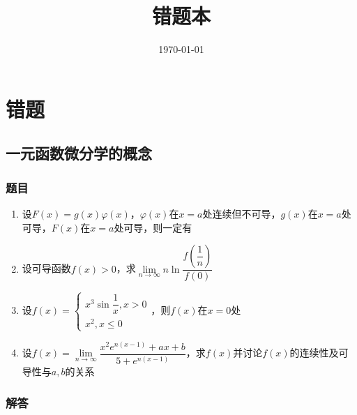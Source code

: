 \documentclass[./book.tex]{subfiles}
\begin{document}
    \title{错题本}
    \date{\today}
    \maketitle
    \renewcommand{\contentsname}{}
    \tableofcontents
    \newpage


    \section{错题}

    \subsection{一元函数微分学的概念}

    \subsubsection{题目}
    \begin{enumerate}
        \item 设$F(x) = g(x)\varphi(x)$，$\varphi(x)$在$x = a$处连续但不可导，$g(x)$在$x = a$处可导，$F(x)$在$x = a$处可导，则一定有
        \item 设可导函数$f(x) > 0$，求$\lim\limits_{n\to \infty} n\ln\dfrac{f(\dfrac{1}{n})}{f(0)}$
        \item 设$f(x) = \begin{cases}
                            x^3 \sin \dfrac{1}{x}, x > 0\\
                            x^2, x \leq 0
        \end{cases}$，则$f(x)$在$x = 0$处
        \item 设$f(x) = \lim\limits_{n\to \infty}\dfrac{x^2 e^{n(x-1)} + ax + b}{5 + e^{n(x-1)}}$，求$f(x)$并讨论$f(x)$的连续性及可导性与$a, b$的关系
    \end{enumerate}

    \subsubsection{解答}
\end{document}
